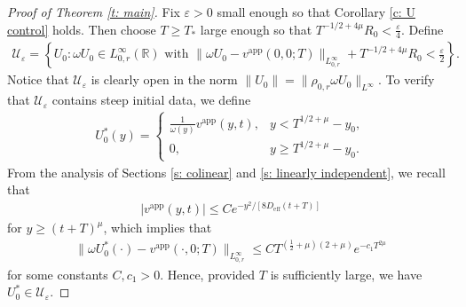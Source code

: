 \documentclass[11pt]{article}
\newcommand{\eps}{\varepsilon}
\newcommand{\R}{\mathbb{R}}
\numberwithin{equation}{section}
\numberwithin{prop}{section}
\newcommand{\Deff}{D_\mathrm{eff}}
\begin{document}
\begin{proof}[Proof of Theorem \ref{t: main}]
	Fix $\eps > 0$ small enough so that Corollary \ref{c: U control} holds. Then choose $T \geq T_*$ large enough so that $T^{-1/2 + 4 \mu} R_0 < \frac{\eps}{4}$. Define
	\begin{align}
	\mathcal{U}_\eps = \left\{ U_0 : \omega U_0 \in L^\infty_{0, r} (\R) \text{ with } \| \omega U_0 - v^\mathrm{app}(0,0;T) \|_{L^\infty_{0, r}} + T^{-1/2+4 \mu} R_0 < \frac{\eps}{2} \right\}. 
	\end{align}
	Notice that $\mathcal{U}_\eps$ is clearly open in the norm $\| U_0 \| = \| \rho_{0,r} \omega U_0 \|_{L^\infty}$. To verify that $\mathcal{U}_\eps$ contains steep initial data, we define
	\begin{align}
	U_0^*(y) = \begin{cases}
	\frac{1}{\omega(y)} v^\mathrm{app} (y,t), & y < T^{1/2 + \mu} - y_0, \\
	0, & y \geq T^{1/2+\mu} - y_0. 
	\end{cases}
	\end{align}
	From the analysis of Sections \ref{s: colinear} and \ref{s: linearly independent}, we recall that 
	\begin{align*}
	|v^\mathrm{app} (y,t)| \leq C e^{-y^2/[8 \Deff (t+T)]} 
	\end{align*}
	for $y \geq (t+T)^\mu$, which implies that
	\begin{align*}
	\| \omega U_0^* (\cdot) - v^\mathrm{app} (\cdot, 0; T) \|_{L^\infty_{0, r}} \leq C T^{(\frac{1}{2} + \mu)(2 + \mu)} e^{-c_1 T^{2\mu}}
	\end{align*}
	for some constants $C, c_1 > 0$. Hence, provided $T$ is sufficiently large, we have $U_0^* \in \mathcal{U}_\eps$. 
	

\end{proof}
\end{document}
